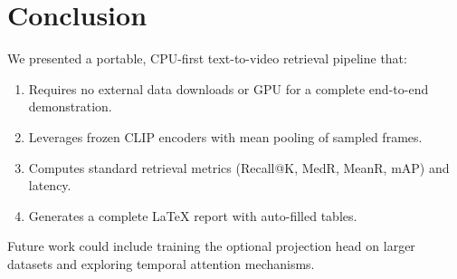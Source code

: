 \section{Conclusion}
\label{sec:conclusion}

We presented a portable, CPU-first text-to-video retrieval pipeline that:
\begin{enumerate}
    \item Requires no external data downloads or GPU for a complete end-to-end demonstration.
    \item Leverages frozen CLIP encoders with mean pooling of sampled frames.
    \item Computes standard retrieval metrics (Recall@K, MedR, MeanR, mAP) and latency.
    \item Generates a complete LaTeX report with auto-filled tables.
\end{enumerate}

Future work could include training the optional projection head on larger datasets and exploring temporal attention mechanisms.
